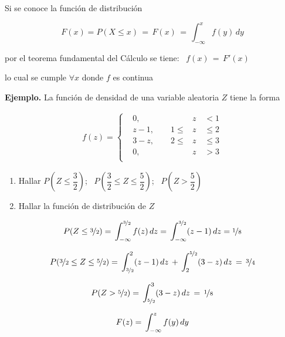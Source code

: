 \documentclass[11pt, a4paper]{article} %
\makeatletter
\newcommand{\mathleft}{\@fleqntrue\@mathmargin0pt}
\makeatother
\begin{document}
Si se conoce la función de distribución

\[
F(x)=P(X \leq x) \, = \, F(x) \,= \, \int_{-\infty}^{x} f(y) \, dy
\]

por el teorema fundamental del Cálculo se tiene: \, \(f(x) \, = \, F'(x)\)

lo cual se cumple \(\forall x \) donde \(f \) es continua

\textbf{Ejemplo.} La función de densidad de una variable aleatoria \(Z\) tiene la forma

\begin{align}
	f(z)
	=	
	\left\{ 
	\begin{aligned}
	&0, \qquad &z \quad < 1\\ \nonumber
	&z-1, \qquad 1\leq &z \quad \leq 2\\ \nonumber
	&3-z, \qquad 2\leq &z \quad \leq 3\\ \nonumber
	&0, \qquad &z \quad > 3\\ \nonumber
	\end{aligned}
	\right.
\end{align}

\begin{enumerate}[label=(\roman*)]
\item 
Hallar \(P(Z\leq \dfrac{3}{2})\); \, \(P(\dfrac{3}{2} \leq Z \leq \dfrac{5}{2})\); \, \(P(Z > \dfrac{5}{2})\)
\item
Hallar la función de distribución de \(Z\)
\end{enumerate}



\mathleft
\[
P(Z\leq \nicefrac{3}{2})
=
\, \int_{-\infty}^{\nicefrac{3}{2}} f(z) \, dz
=
\, \int_{-\infty}^{\nicefrac{3}{2}} (z-1) \, dz
=
\nicefrac{1}{8}
\\
\]

\[
P(\nicefrac{3}{2} \leq Z \leq \nicefrac{5}{2})
=
\, \int_{\nicefrac{3}{2}}^{2} (z-1) \, dz \, + \, \int_{2}^{\nicefrac{5}{2}} (3-z) \, dz  \, = \, \nicefrac{3}{4}
\\
\]

\[
P( Z > \nicefrac{5}{2})
=
\, \int_{\nicefrac{5}{2}}^{3} (3-z) \, dz \, = \, \nicefrac{1}{8}
\\
\]

\[
F(z)
=
\, \int_{-\infty}^{z} f(y) \, dy 
\\
\]
\end{document}
